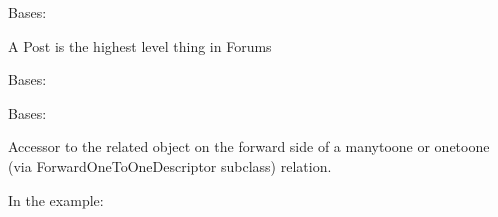 \documentclass[letterpaper,10pt,english]{sphinxmanual}
\begin{document}

\begin{fulllineitems}
\label{\detokenize{forums:forums.models.Post}}
Bases: {\hyperref[\detokenize{forums:forums.models.AbstractForum}]{}}

A Post is the highest level thing in Forums

\begin{fulllineitems}
\label{\detokenize{forums:forums.models.Post.DoesNotExist}}
Bases: 

\end{fulllineitems}


\begin{fulllineitems}
\label{\detokenize{forums:forums.models.Post.MultipleObjectsReturned}}
Bases: 

\end{fulllineitems}


\begin{fulllineitems}
\label{\detokenize{forums:forums.models.Post.author}}
Accessor to the related object on the forward side of a many\sphinxhyphen{}to\sphinxhyphen{}one or
one\sphinxhyphen{}to\sphinxhyphen{}one (via ForwardOneToOneDescriptor subclass) relation.

In the example:

\begin{sphinxVerbatim}[commandchars=\\\{\}]
 
       
\end{sphinxVerbatim}


\end{fulllineitems}
\end{fulllineitems}
\end{document}
